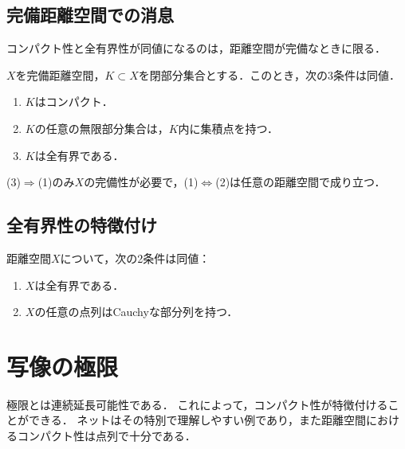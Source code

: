 \documentclass[uplatex,dvipdfmx]{jsreport}
\begin{document}
\subsection{完備距離空間での消息}

\begin{tcolorbox}[colframe=ForestGreen, colback=ForestGreen!10!white,breakable,colbacktitle=ForestGreen!40!white,coltitle=black,fonttitle=\bfseries\sffamily,
title=]
    コンパクト性と全有界性が同値になるのは，距離空間が完備なときに限る．
\end{tcolorbox}

\begin{theorem}
    $X$を完備距離空間，$K\subset X$を閉部分集合とする．このとき，次の3条件は同値．
    \begin{enumerate}
        \item $K$はコンパクト．
        \item $K$の任意の無限部分集合は，$K$内に集積点を持つ．
        \item $K$は全有界である．
    \end{enumerate}
    (3)$\Rightarrow$(1)のみ$X$の完備性が必要で，(1)$\Leftrightarrow$(2)は任意の距離空間で成り立つ．
\end{theorem}

\subsection{全有界性の特徴付け}

\begin{theorem}
    距離空間$X$について，次の2条件は同値：
    \begin{enumerate}
        \item $X$は全有界である．
        \item $X$の任意の点列はCauchyな部分列を持つ．
    \end{enumerate}
\end{theorem}

\section{写像の極限}

\begin{tcolorbox}[colframe=ForestGreen, colback=ForestGreen!10!white,breakable,colbacktitle=ForestGreen!40!white,coltitle=black,fonttitle=\bfseries\sffamily,
title=]
    極限とは連続延長可能性である．
    これによって，コンパクト性が特徴付けることができる．
    ネットはその特別で理解しやすい例であり，また距離空間におけるコンパクト性は点列で十分である．
\end{tcolorbox}
\end{document}
